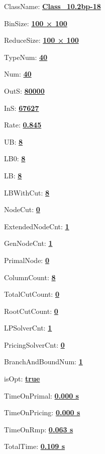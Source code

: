 \documentclass[11pt]{article}
\begin{document}
\pagestyle{empty}


ClassName: \underline{\textbf{Class_10.2bp-18}}
\par
BinSize: \underline{\textbf{100 × 100}}
\par
ReduceSize: \underline{\textbf{100 × 100}}
\par
TypeNum: \underline{\textbf{40}}
\par
Num: \underline{\textbf{40}}
\par
OutS: \underline{\textbf{80000}}
\par
InS: \underline{\textbf{67627}}
\par
Rate: \underline{\textbf{0.845}}
\par
UB: \underline{\textbf{8}}
\par
LB0: \underline{\textbf{8}}
\par
LB: \underline{\textbf{8}}
\par
LBWithCut: \underline{\textbf{8}}
\par
NodeCut: \underline{\textbf{0}}
\par
ExtendedNodeCnt: \underline{\textbf{1}}
\par
GenNodeCnt: \underline{\textbf{1}}
\par
PrimalNode: \underline{\textbf{0}}
\par
ColumnCount: \underline{\textbf{8}}
\par
TotalCutCount: \underline{\textbf{0}}
\par
RootCutCount: \underline{\textbf{0}}
\par
LPSolverCnt: \underline{\textbf{1}}
\par
PricingSolverCnt: \underline{\textbf{0}}
\par
BranchAndBoundNum: \underline{\textbf{1}}
\par
isOpt: \underline{\textbf{true}}
\par
TimeOnPrimal: \underline{\textbf{0.000 s}}
\par
TimeOnPricing: \underline{\textbf{0.000 s}}
\par
TimeOnRmp: \underline{\textbf{0.063 s}}
\par
TotalTime: \underline{\textbf{0.109 s}}
\par
\newpage


\end{document}
